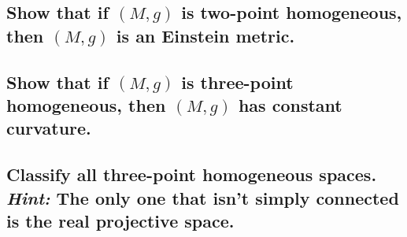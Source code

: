 \documentclass[10pt]{article}
\DeclareMathOperator{\2}{II}
\newcommand{\hint}[1]{{\emph{Hint:} #1}} %
\begin{document}
\subsection{Show that if $(M,g)$ is two-point homogeneous, then $(M,g)$ is an Einstein metric.}
\subsection{Show that if $(M,g)$ is three-point homogeneous, then $(M,g)$ has constant curvature.}
\subsection{Classify all three-point homogeneous spaces. \hint{The only one that isn't simply connected is the real projective space.}}
\end{document}

